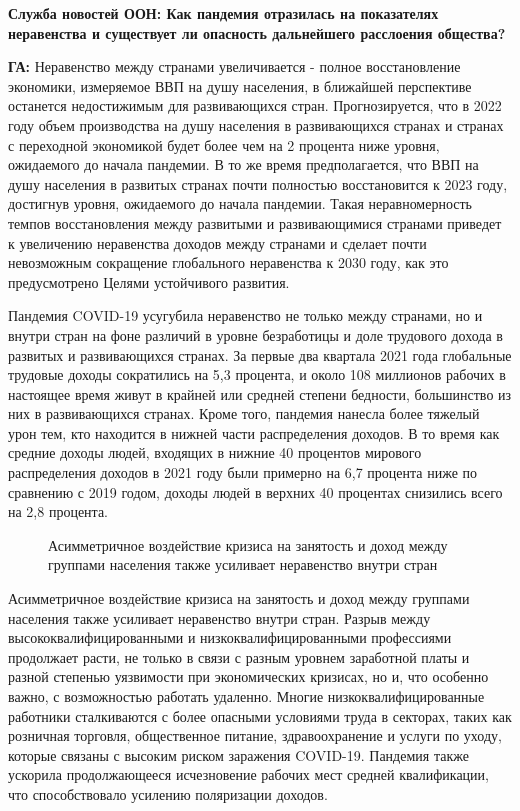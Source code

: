 \textbf{Служба новостей ООН: Как пандемия отразилась на показателях неравенства и существует ли опасность дальнейшего расслоения общества? }

\textbf{ГА:} Неравенство между странами увеличивается - полное восстановление экономики, измеряемое ВВП на душу населения, в ближайшей перспективе останется недостижимым для развивающихся стран. Прогнозируется, что в 2022 году объем производства на душу населения в развивающихся странах и странах с переходной экономикой будет более чем на 2 процента ниже уровня, ожидаемого до начала пандемии.  В то же время предполагается, что ВВП на душу населения в развитых странах почти полностью восстановится к 2023 году, достигнув уровня, ожидаемого до начала пандемии. Такая неравномерность темпов восстановления между развитыми и развивающимися странами приведет к увеличению неравенства доходов между странами и сделает почти невозможным сокращение глобального неравенства к 2030 году, как это предусмотрено Целями устойчивого развития.

Пандемия COVID-19 усугубила неравенство не только между странами, но и внутри стран на фоне различий в уровне безработицы и доле трудового дохода в развитых и развивающихся странах. За первые два квартала 2021 года глобальные трудовые доходы сократились на 5,3 процента, и около 108 миллионов рабочих в настоящее время живут в крайней или средней степени бедности, большинство из них в развивающихся странах. Кроме того, пандемия нанесла более тяжелый урон тем, кто находится в нижней части распределения доходов. В то время как средние доходы людей, входящих в нижние 40 процентов мирового распределения доходов в 2021 году были примерно на 6,7 процента ниже по сравнению с 2019 годом, доходы людей в верхних 40 процентах снизились всего на 2,8 процента.

\begin{figure}
    \begin{fancyquotes}
        Асимметричное воздействие кризиса на занятость и доход между группами населения также усиливает неравенство внутри стран
    \end{fancyquotes}
\end{figure}
Асимметричное воздействие кризиса на занятость и доход между группами населения также усиливает неравенство внутри стран. Разрыв между высококвалифицированными и низкоквалифицированными профессиями продолжает расти, не только в связи с разным уровнем заработной платы и разной степенью уязвимости при экономических кризисах, но и, что особенно важно, с возможностью работать удаленно. Многие низкоквалифицированные работники сталкиваются с более опасными условиями труда в секторах, таких как розничная торговля, общественное питание, здравоохранение и услуги по уходу, которые связаны с высоким риском заражения COVID-19. Пандемия также ускорила продолжающееся исчезновение рабочих мест средней квалификации, что способствовало усилению поляризации доходов.

